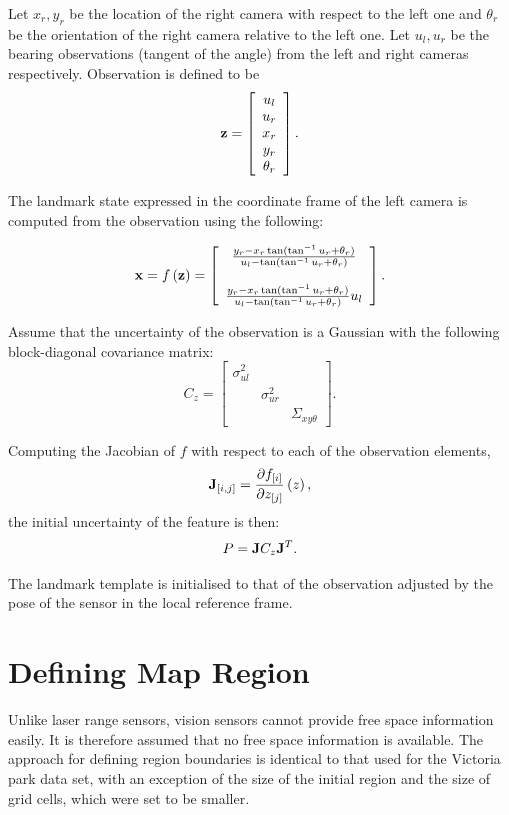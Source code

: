 Let $x_r,y_r$ be the location of the right camera with respect to the
left one and $\theta_r$ be the orientation of the right camera
relative to the left one. Let $u_l,u_r$ be the bearing observations
(tangent of the angle) from the left and right cameras
respectively. Observation is defined to be
$$
{\bf z} =  \left[
    \begin{array}{c}
       u_l\\u_r\\x_r\\y_r\\\theta_r
    \end{array}
\right].
$$

The landmark state expressed in the coordinate frame of the left
camera is computed from the observation using the following:

$$
{\bf x} = f\left({\bf z}\right) 
= \left[\begin{array}{c}
\frac{y_r - x_r\tan(\tan^{-1} u_r+\theta_r)}{u_l-\tan(\tan^{-1} u_r+\theta_r) }\\
{}\\
\frac{y_r - x_r\tan(\tan^{-1} u_r+\theta_r)}{u_l-\tan(\tan^{-1} u_r+\theta_r)}u_l
\end{array}
\right].
$$

Assume that the uncertainty of the observation is a Gaussian with
the following block-diagonal covariance matrix:
$$
C_z = \left[
  \begin{array}{ccc}
    \sigma^2_{ul} &             & \\
                & \sigma^2_{ur} & \\
                &             & \Sigma_{xy\theta}
  \end{array}
\right].
$$

Computing the Jacobian of $f$ with respect to each of the
observation elements,
$$
{\bf J}_{[i,j]} = \frac{\partial f_{[i]}}
{\partial z_{[j]}}\left(z \right),
$$
the initial uncertainty of the feature is then:
$$
P = {\bf J} C_z {\bf J}^T.
$$

The landmark template is initialised to that of the observation
adjusted by the pose of the sensor in the local reference frame.

\section{Defining Map Region}

Unlike laser range sensors, vision sensors cannot provide free space
information easily. It is therefore assumed that no free space
information is available. The approach for defining region boundaries
is identical to that used for the Victoria park data set, with an
exception of the size of the initial region and the size of grid
cells, which were set to be smaller.

